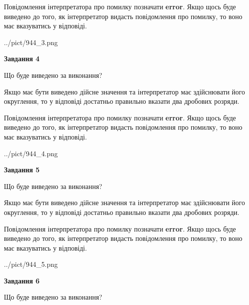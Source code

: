 \documentclass[12pt, ukrainian]{article}
\begin{document}
{\begin {Large}
Повідомлення інтерпретатора про помилку позначати \textbf{error}.
Якщо щось буде виведено до того, як інтерпретатор видасть повідомлення про помилку, 
то воно має вказуватись у відповіді. \par

\begin{center}
	{../pict/944_3.png}
\end{center}
\newpage

{\begin {center}\textbf{Завдання 4}\end {center}}\par
Що буде виведено за виконання? \par

Якщо має бути виведено дійсне значення та інтерпретатор має здійснювати його округлення, 
то у відповіді достатньо правильно вказати два дробових розряди.

Повідомлення інтерпретатора про помилку позначати \textbf{error}.
Якщо щось буде виведено до того, як інтерпретатор видасть повідомлення про помилку, 
то воно має вказуватись у відповіді. \par

\begin{center}
	{../pict/944_4.png}
\end{center}
\newpage

{\begin {center}\textbf{Завдання 5}\end {center}}\par
Що буде виведено за виконання? \par

Якщо має бути виведено дійсне значення та інтерпретатор має здійснювати його округлення, 
то у відповіді достатньо правильно вказати два дробових розряди.

Повідомлення інтерпретатора про помилку позначати \textbf{error}.
Якщо щось буде виведено до того, як інтерпретатор видасть повідомлення про помилку, 
то воно має вказуватись у відповіді. \par

\begin{center}
	{../pict/944_5.png}
\end{center}
\newpage

{\begin {center}\textbf{Завдання 6}\end {center}}\par
Що буде виведено за виконання? \par


\end{Large}}
\end{document}
